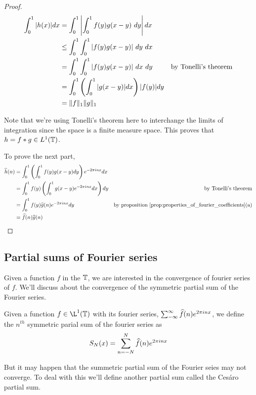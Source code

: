   \begin{proof}
    \begin{align*}
  \int_{0}^{1} |h(x)| dx &= \int_{0}^{1} \left| \int_{0}^{1} f(y)g(x-y)\  dy \right| dx \\
                         &\le \int_{0}^{1} \int_{0}^{1} |f(y)g(x-y)| \ dy \ dx \\
                         &= \int_{0}^{1} \int_{0}^{1} |f(y)g(x-y)| \ dx \ dy & \text{by Tonelli's theorem}\\
                         &= \int_{0}^{1} \left( \int_{0}^{1} |g(x-y)| dx \right) |f(y)|dy \\
                         &=\norm{f}_1 \norm{g}_1
    \end{align*}

    Note that we're using Tonelli's theorem here to interchange the limits of integration since the space is a finite measure space. This proves that $h = f*g \in L^1(\mathbb T)$.

    To prove the next part,
    \begin{align*}
      \widehat{h}(n) &= \int_0^1 \left( \int_0^1 f(y)g(x-y)dy \right) e^{-2\pi in x} dx \\
               &= \int_0^1 f(y) \left( \int_0^1 g(x-y) e^{-2\pi in x}dx \right) dy & \text{by Tonelli's theorem}\\  
               &= \int_0^1 f(y) \widehat{g}(n)e^{-2\pi inx} dy & \text{by proposition } \ref{prop:properties_of_fourier_coefficients} \text{(a)}\\
               &= \widehat{f}(n)\widehat{g}(n)
    \end{align*}
  \end{proof}
 

  \subsection{Partial sums of Fourier series}
  Given a function $f$ in the $\mathbb T$, we are interested in the convergence of fourier series of $f$. We'll discuss about the convergence of the symmetric partial sum of the Fourier series.

  \begin{definition}
    \label{def:symmetric_partial_sum_of_fourier_series}
    Given a function $f \in \L^1(\T)$ with its fourier series, $\sum_{-\infty}^\infty \widehat{f}(n)e^{2\pi in x}$, we define the $n^{th}$ symmetric parial sum of the fourier series as
    \begin{displaymath}
      S_N(x) = \sum_{n=-N}^N \widehat{f}(n)e^{2\pi inx}
    \end{displaymath}
  \end{definition}
  But it may happen that the summetric partial sum of the Fourier seies may not converge. To deal with this we'll define another partial sum called the Ces\'aro partial sum.

